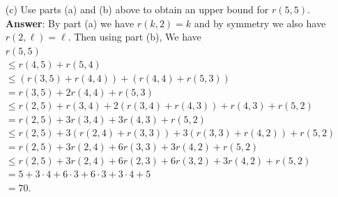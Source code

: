\documentclass{article}
\begin{document}
\begin{itemize}
\begin{itemize}
                  \item [(c)] Use parts (a) and (b) above to obtain an upper bound for $r(5,5)$.\\
                        \textbf{Answer}: By part (a) we have $r(k,2)=k$ and by symmetry we also have $r(2,\ell)=\ell$. Then using part (b), We have \\
                        $r(5,5)$\\$\leq r(4,5)+r(5,4)$\\$\leq (r(3,5)+r(4,4))+(r(4,4)+r(5,3))$\\$=r(3,5)+2r(4,4)+r(5,3)$\\$\leq r(2,5)+r(3,4)+2(r(3,4)+r(4,3))+r(4,3)+r(5,2)$\\$=r(2,5)+3r(3,4)+3r(4,3)+r(5,2)$\\$\leq r(2,5)+3(r(2,4)+r(3,3))+3(r(3,3)+r(4,2))+r(5,2)$\\$=r(2,5)+3r(2,4)+6r(3,3)+3r(4,2)+r(5,2)$\\$\leq r(2,5)+3r(2,4)+6r(2,3)+6r(3,2)+3r(4,2)+r(5,2)$\\$=5+3\cdot 4+6\cdot 3+6\cdot 3+3\cdot 4+5$\\$=70$.
            \end{itemize}
\end{itemize}
\end{document}
